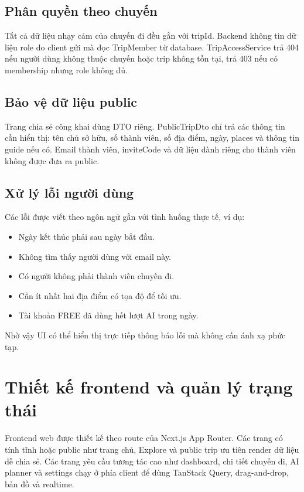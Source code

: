 \documentclass[a4paper]{report}
\begin{document}
\subsection{Phân quyền theo chuyến}

Tất cả dữ liệu nhạy cảm của chuyến đi đều gắn với tripId. Backend không tin dữ liệu role do client gửi mà đọc TripMember từ database. TripAccessService trả 404 nếu người dùng không thuộc chuyến hoặc trip không tồn tại, trả 403 nếu có membership nhưng role không đủ.

\subsection{Bảo vệ dữ liệu public}

Trang chia sẻ công khai dùng DTO riêng. PublicTripDto chỉ trả các thông tin cần hiển thị: tên chủ sở hữu, số thành viên, số địa điểm, ngày, places và thông tin guide nếu có. Email thành viên, inviteCode và dữ liệu dành riêng cho thành viên không được đưa ra public.

\subsection{Xử lý lỗi người dùng}

Các lỗi được viết theo ngôn ngữ gần với tình huống thực tế, ví dụ:

\begin{itemize}
  \item Ngày kết thúc phải sau ngày bắt đầu.
  \item Không tìm thấy người dùng với email này.
  \item Có người không phải thành viên chuyến đi.
  \item Cần ít nhất hai địa điểm có tọa độ để tối ưu.
  \item Tài khoản FREE đã dùng hết lượt AI trong ngày.
\end{itemize}

Nhờ vậy UI có thể hiển thị trực tiếp thông báo lỗi mà không cần ánh xạ phức tạp.

\section{Thiết kế frontend và quản lý trạng thái}

Frontend web được thiết kế theo route của Next.js App Router. Các trang có tính tĩnh hoặc public như trang chủ, Explore và public trip ưu tiên render dữ liệu dễ chia sẻ. Các trang yêu cầu tương tác cao như dashboard, chi tiết chuyến đi, AI planner và settings chạy ở phía client để dùng TanStack Query, drag-and-drop, bản đồ và realtime.
\end{document}
